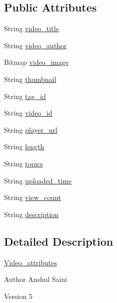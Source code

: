 \subsection*{Public Attributes}
\begin{DoxyCompactItemize}
\item 
String \hyperlink{classcom_1_1video__browser__thesis_1_1elements_1_1_video__attributes_a90fcc84191f2c525436bdc0cfb1653ea}{video\-\_\-title}
\item 
String \hyperlink{classcom_1_1video__browser__thesis_1_1elements_1_1_video__attributes_abd33d1952b8a62347f0f661c3c2ec5ed}{video\-\_\-author}
\item 
Bitmap \hyperlink{classcom_1_1video__browser__thesis_1_1elements_1_1_video__attributes_a9a6848418e1b8750117df0f895e90320}{video\-\_\-image}
\item 
String \hyperlink{classcom_1_1video__browser__thesis_1_1elements_1_1_video__attributes_ae602e9e2f3ec0641635063eeecdef8c0}{thumbnail}
\item 
String \hyperlink{classcom_1_1video__browser__thesis_1_1elements_1_1_video__attributes_a12b1f3d1b5415ac60dddba277c4ddebc}{tag\-\_\-id}
\item 
String \hyperlink{classcom_1_1video__browser__thesis_1_1elements_1_1_video__attributes_a7113a6d7df8608b786990974dc8bd269}{video\-\_\-id}
\item 
String \hyperlink{classcom_1_1video__browser__thesis_1_1elements_1_1_video__attributes_a52b04c0ee9b91beafc8bb585d7c968b2}{player\-\_\-url}
\item 
String \hyperlink{classcom_1_1video__browser__thesis_1_1elements_1_1_video__attributes_aae8458cd610150fe777bcfed6ce6b2e5}{length}
\item 
String \hyperlink{classcom_1_1video__browser__thesis_1_1elements_1_1_video__attributes_ae38e2927f054bedae6fd00d5a6d89332}{topics}
\item 
String \hyperlink{classcom_1_1video__browser__thesis_1_1elements_1_1_video__attributes_ab249aab820838b9cce924dcf2e684e30}{uploaded\-\_\-time}
\item 
String \hyperlink{classcom_1_1video__browser__thesis_1_1elements_1_1_video__attributes_ab32c45e2134b0fbe136713e179ca3bb6}{view\-\_\-count}
\item 
String \hyperlink{classcom_1_1video__browser__thesis_1_1elements_1_1_video__attributes_a8fe934f1116f75edb5cc4d9a74d0c33b}{description}
\end{DoxyCompactItemize}


\subsection{Detailed Description}
\hyperlink{classcom_1_1video__browser__thesis_1_1elements_1_1_video__attributes}{Video\-\_\-attributes} \begin{DoxyAuthor}{Author}
Anshul Saini 
\end{DoxyAuthor}
\begin{DoxyVersion}{Version}
5 
\end{DoxyVersion}


